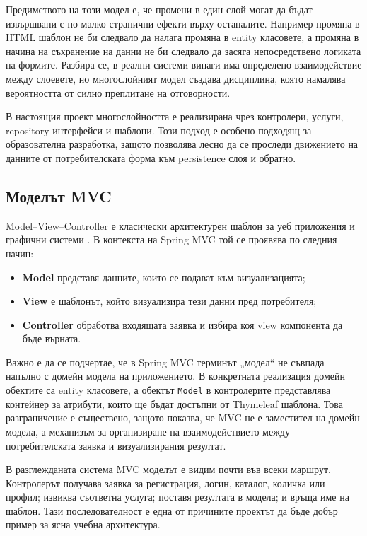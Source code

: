 Предимството на този модел е, че промени в един слой могат да бъдат извършвани с по-малко странични ефекти върху останалите. Например промяна в HTML шаблон не би следвало да налага промяна в entity класовете, а промяна в начина на съхранение на данни не би следвало да засяга непосредствено логиката на формите. Разбира се, в реални системи винаги има определено взаимодействие между слоевете, но многослойният модел създава дисциплина, която намалява вероятността от силно преплитане на отговорности.

В настоящия проект многослойността е реализирана чрез контролери, услуги, repository интерфейси и шаблони. Този подход е особено подходящ за образователна разработка, защото позволява лесно да се проследи движението на данните от потребителската форма към persistence слоя и обратно.

\subsection{Моделът MVC}

Model--View--Controller е класически архитектурен шаблон за уеб приложения и графични системи \cite{springmvc}. В контекста на Spring MVC той се проявява по следния начин:

\begin{itemize}[leftmargin=*]
    \item \textbf{Model} представя данните, които се подават към визуализацията;
    \item \textbf{View} е шаблонът, който визуализира тези данни пред потребителя;
    \item \textbf{Controller} обработва входящата заявка и избира коя view компонента да бъде върната.
\end{itemize}

Важно е да се подчертае, че в Spring MVC терминът „модел“ не съвпада напълно с домейн модела на приложението. В конкретната реализация домейн обектите са entity класовете, а обектът \texttt{Model} в контролерите представлява контейнер за атрибути, които ще бъдат достъпни от Thymeleaf шаблона. Това разграничение е съществено, защото показва, че MVC не е заместител на домейн модела, а механизъм за организиране на взаимодействието между потребителската заявка и визуализирания резултат.

В разглежданата система MVC моделът е видим почти във всеки маршрут. Контролерът получава заявка за регистрация, логин, каталог, количка или профил; извиква съответна услуга; поставя резултата в модела; и връща име на шаблон. Тази последователност е една от причините проектът да бъде добър пример за ясна учебна архитектура.

